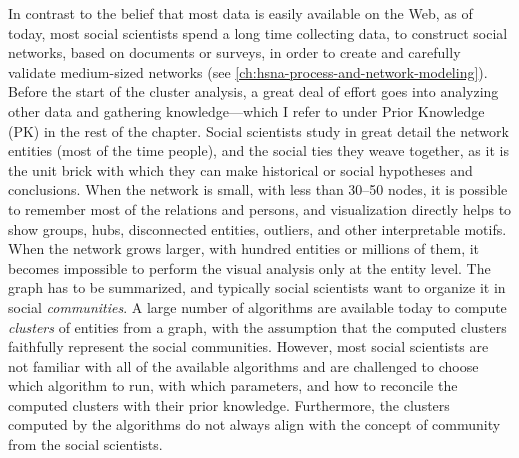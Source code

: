 In contrast to the belief that most data is easily available on the Web, as of today, most social scientists spend a long time collecting data, to construct social networks, based on documents or surveys, in order to create and carefully validate medium-sized networks (see \autoref{ch:hsna-process-and-network-modeling}).
Before the start of the cluster analysis, a great deal of effort goes into analyzing other data and gathering knowledge---which I refer to under Prior Knowledge (PK) in the rest of the chapter.
Social scientists study in great detail the network entities (most of the time people), and the social ties they weave together, as it is the unit brick with which they can make historical or social hypotheses and conclusions.
When the network is small, with less than 30--50 nodes, it is possible to remember most of the relations and persons, and visualization directly helps to show groups, hubs, disconnected entities, outliers, and other interpretable motifs.
When the network grows larger, with hundred entities or millions of them, it becomes impossible to perform the visual analysis only at the entity level.
The graph has to be summarized, and typically social scientists want to organize it in social \emph{communities}.  A large number of algorithms are available today to compute \emph{clusters} of entities from a graph, with the assumption that the computed clusters faithfully represent the social communities.
However, most social scientists are not familiar with all of the available algorithms and are challenged to choose which algorithm to run, with which parameters, and how to reconcile the computed clusters with their prior knowledge. Furthermore, the clusters computed by the algorithms do not always align with the concept of community from the social scientists.


